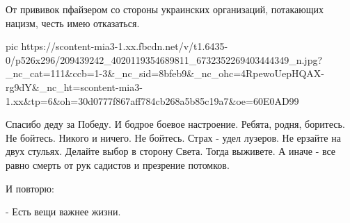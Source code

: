 От прививок пфайзером со стороны украинских организаций, потакающих нацизм,
честь имею отказаться. 

\ifcmt
  pic https://scontent-mia3-1.xx.fbcdn.net/v/t1.6435-0/p526x296/209439242_4020119354689811_6732352269403444349_n.jpg?_nc_cat=111&ccb=1-3&_nc_sid=8bfeb9&_nc_ohc=4RpewoUepHQAX-rg9dY&_nc_ht=scontent-mia3-1.xx&tp=6&oh=30d0777f867aff784cb268a5b85c19a7&oe=60E0AD99
\fi

Спасибо деду за Победу. И бодрое боевое настроение. Ребята, родня, боритесь. Не
бойтесь. Никого и ничего. Не бойтесь. Страх - удел лузеров. Не ерзайте на двух
стульях. Делайте выбор в сторону Света. Тогда выживете. А иначе - все равно
смерть от рук садистов и презрение потомков. 

И повторю:

- Есть вещи важнее жизни.

